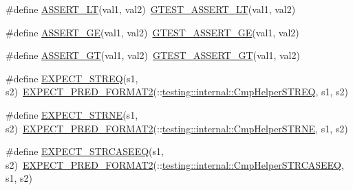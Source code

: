 \begin{DoxyCompactItemize}
\item 
\#define \mbox{\hyperlink{_obj__test_2lib_2googletest-master_2googletest_2include_2gtest_2gtest_8h_affc4f9cae4c3aabfe60fced83737b42c}{A\+S\+S\+E\+R\+T\+\_\+\+LT}}(val1,  val2)~\mbox{\hyperlink{_obj__test_2lib_2googletest-release-1_88_81_2googletest_2include_2gtest_2gtest_8h_a5a75667e637febd18e5f7d4f3abf55e8}{G\+T\+E\+S\+T\+\_\+\+A\+S\+S\+E\+R\+T\+\_\+\+LT}}(val1, val2)
\item 
\#define \mbox{\hyperlink{_obj__test_2lib_2googletest-master_2googletest_2include_2gtest_2gtest_8h_af4ff5dc71479fcb374b6bc2ed195bcc4}{A\+S\+S\+E\+R\+T\+\_\+\+GE}}(val1,  val2)~\mbox{\hyperlink{_obj__test_2lib_2googletest-release-1_88_81_2googletest_2include_2gtest_2gtest_8h_a55373d99c079ff1b894e2eb5bcd15c5a}{G\+T\+E\+S\+T\+\_\+\+A\+S\+S\+E\+R\+T\+\_\+\+GE}}(val1, val2)
\item 
\#define \mbox{\hyperlink{_obj__test_2lib_2googletest-master_2googletest_2include_2gtest_2gtest_8h_a16a882d4eafc9f8643867aea40879140}{A\+S\+S\+E\+R\+T\+\_\+\+GT}}(val1,  val2)~\mbox{\hyperlink{_obj__test_2lib_2googletest-release-1_88_81_2googletest_2include_2gtest_2gtest_8h_a088b9056fd1c1f316b41c22f64deb33a}{G\+T\+E\+S\+T\+\_\+\+A\+S\+S\+E\+R\+T\+\_\+\+GT}}(val1, val2)
\item 
\#define \mbox{\hyperlink{_obj__test_2lib_2googletest-master_2googletest_2include_2gtest_2gtest_8h_ad20f7b94ac5081e16f0005b94e95f0c6}{E\+X\+P\+E\+C\+T\+\_\+\+S\+T\+R\+EQ}}(s1,  s2)~\mbox{\hyperlink{_obj__test_2lib_2googletest-release-1_88_81_2googletest_2include_2gtest_2gtest__pred__impl_8h_af0141918615a5e2d5247e9cda8324dae}{E\+X\+P\+E\+C\+T\+\_\+\+P\+R\+E\+D\+\_\+\+F\+O\+R\+M\+A\+T2}}(\+::\mbox{\hyperlink{namespacetesting_1_1internal_a711a396ed8f636ecd14a850a89d181b6}{testing\+::internal\+::\+Cmp\+Helper\+S\+T\+R\+EQ}}, s1, s2)
\item 
\#define \mbox{\hyperlink{_obj__test_2lib_2googletest-master_2googletest_2include_2gtest_2gtest_8h_aee7e9c42f55549dbc0dfc42391eb9775}{E\+X\+P\+E\+C\+T\+\_\+\+S\+T\+R\+NE}}(s1,  s2)~\mbox{\hyperlink{_obj__test_2lib_2googletest-release-1_88_81_2googletest_2include_2gtest_2gtest__pred__impl_8h_af0141918615a5e2d5247e9cda8324dae}{E\+X\+P\+E\+C\+T\+\_\+\+P\+R\+E\+D\+\_\+\+F\+O\+R\+M\+A\+T2}}(\+::\mbox{\hyperlink{namespacetesting_1_1internal_af2d31c77ce73e1003a64bd7ca3564bbe}{testing\+::internal\+::\+Cmp\+Helper\+S\+T\+R\+NE}}, s1, s2)
\item 
\#define \mbox{\hyperlink{_obj__test_2lib_2googletest-master_2googletest_2include_2gtest_2gtest_8h_a740cab7e3eec5c178a64b4f558bde66e}{E\+X\+P\+E\+C\+T\+\_\+\+S\+T\+R\+C\+A\+S\+E\+EQ}}(s1,  s2)~\mbox{\hyperlink{_obj__test_2lib_2googletest-release-1_88_81_2googletest_2include_2gtest_2gtest__pred__impl_8h_af0141918615a5e2d5247e9cda8324dae}{E\+X\+P\+E\+C\+T\+\_\+\+P\+R\+E\+D\+\_\+\+F\+O\+R\+M\+A\+T2}}(\+::\mbox{\hyperlink{namespacetesting_1_1internal_a30dfeb01f1bc8087c7d05205d5fa75c1}{testing\+::internal\+::\+Cmp\+Helper\+S\+T\+R\+C\+A\+S\+E\+EQ}}, s1, s2)

\end{DoxyCompactItemize}
